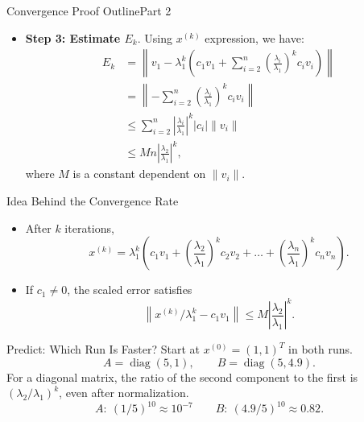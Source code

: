 \documentclass[10pt]{beamer}
\begin{document}
\begin{frame}{Convergence Proof Outline}{Part 2}
\begin{itemize}
    \item \textbf{Step 3: Estimate \( E_k \)}.  
    Using \( x^{(k)} \) expression, we have:
    \begin{align}
    E_k &= \left\| v_1 - \lambda_1^k\left( c_1 v_1 + \sum_{i=2}^n \left(\frac{\lambda_i}{\lambda_1}\right)^k c_i v_i \right) \right\| \\     
        &= \left\| -\sum_{i=2}^n \left(\frac{\lambda_i}{\lambda_1}\right)^k c_i v_i \right\| \\   
        &\leq \sum_{i=2}^n \left| \frac{\lambda_i}{\lambda_1} \right|^k |c_i| \|v_i\| \\  
        &\leq M n \left| \frac{\lambda_2}{\lambda_1} \right|^k,
    \end{align}
    where \( M \) is a constant dependent on \( \|v_i\| \).
\end{itemize}
\end{frame}

\begin{frame}{Idea Behind the Convergence Rate}

\begin{itemize}
    \item After \( k \) iterations,
    \[
    x^{(k)} = \lambda_1^k\left( c_1 v_1 + \left(\frac{\lambda_2}{\lambda_1}\right)^k c_2 v_2 + \dots + \left(\frac{\lambda_n}{\lambda_1}\right)^k c_n v_n \right).
    \]
    \item If $c_1\ne0$, the scaled error satisfies
    \[
      \left\|x^{(k)}/\lambda_1^k-c_1v_1\right\|
      \le M\left|\frac{\lambda_2}{\lambda_1}\right|^k .
    \] 
\end{itemize}
\end{frame}

\begin{frame}{Predict: Which Run Is Faster?}
Start at $x^{(0)}=(1,1)^T$ in both runs.
\[
A=\operatorname{diag}(5,1),\qquad B=\operatorname{diag}(5,4.9).
\]
\pause
For a diagonal matrix, the ratio of the second component to the first is
$(\lambda_2/\lambda_1)^k$, even after normalization.
\[
A:\ (1/5)^{10}\approx10^{-7}
\qquad B:\ (4.9/5)^{10}\approx0.82.
\]
\end{frame}
\end{document}
